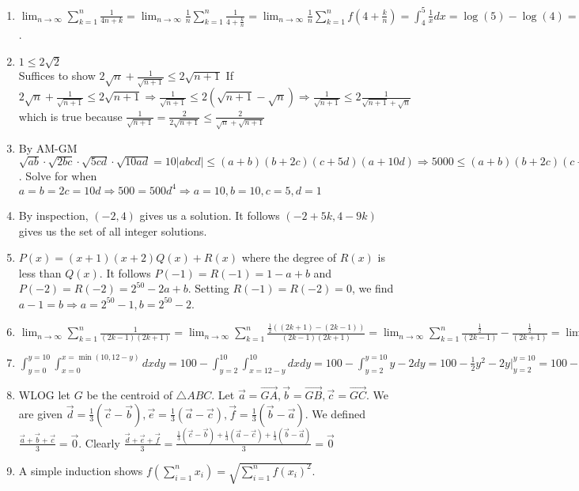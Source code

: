 \documentclass[10pt]{article}
\begin{document}
\begin{enumerate}[label= (Q-\arabic*)]
    \item $\lim_{n\rightarrow\infty}\sum_{k=1}^{n}\frac{1}{4n+k}=\lim_{n\rightarrow\infty}\frac{1}{n}\sum_{k=1}^{n}\frac{1}{4+\frac{k}{n}}=\lim_{n\rightarrow\infty}\frac{1}{n}\sum_{k=1}^{n}f(4+\frac{k}{n})=\int_4^5\frac{1}{x}dx=\log(5)-\log(4)=\log(\frac{5}{4})$.
    \item $1\le 2\sqrt{2}$\\
    Suffices to show $2\sqrt{n}+\frac{1}{\sqrt{n+1}}\le 2\sqrt{n+1}$
    If $2\sqrt{n}+\frac{1}{\sqrt{n+1}}\le 2\sqrt{n+1}\Rightarrow \frac{1}{\sqrt{n+1}}\le 2(\sqrt{n+1}-\sqrt{n})\Rightarrow\frac{1}{\sqrt{n+1}}\le 2\frac{1}{\sqrt{n+1}+\sqrt{n}}$ which is true because $\frac{1}{\sqrt{n+1}}=\frac{2}{2\sqrt{n+1}}\le\frac{2}{\sqrt{n}+\sqrt{n+1}}$
    \item By AM-GM $\sqrt{ab}\cdot\sqrt{2bc}\cdot\sqrt{5cd}\cdot\sqrt{10ad}=10|abcd|\le (a+b)(b+2c)(c+5d)(a+10d)\Rightarrow 5000\le (a+b)(b+2c)(c+5d)(a+10d)$. Solve for when $a=b=2c=10d\Rightarrow 500=500d^4\Rightarrow a=10,b=10,c=5,d=1$ 
    \item By inspection, $(-2,4)$ gives us a solution. It follows $(-2+5k,4-9k)$ gives us the set of all integer solutions.
    \item $P(x)=(x+1)(x+2)Q(x)+R(x)$ where the degree of $R(x)$ is less than $Q(x)$. It follows $P(-1)=R(-1)=1-a+b$ and $P(-2)=R(-2)=2^{50}-2a+b$. Setting $R(-1)=R(-2)=0$, we find $a-1=b\Rightarrow a=2^{50}-1,b=2^{50}-2$.
    \item $\lim_{n\rightarrow\infty} \sum_{k=1}^{n}\frac{1}{(2k-1)(2k+1)}=\lim_{n\rightarrow\infty}\sum_{k=1}^{n}\frac{\frac{1}{2}((2k+1)-(2k-1))}{(2k-1)(2k+1)}=\lim_{n\rightarrow\infty}\sum_{k=1}^{n}\frac{\frac{1}{2}}{(2k-1)}-\frac{\frac{1}{2}}{(2k+1)}=\lim_{n\rightarrow\infty}\frac{1}{2}\frac{1}{1}-\frac{1}{2}\frac{1}{2n+1}=\frac{1}{2}$
    \item $\int_{y=0}^{y=10}\int_{x=0}^{x=\min(10,12-y)}dxdy=100-\int_{y=2}^{10}\int_{x=12-y}^{10}dxdy=100-\int_{y=2}^{y=10}y-2dy=100-\frac{1}{2}y^2-2y|_{y=2}^{y=10}=100-30-2=68\Rightarrow P(x+y\le12)=\frac{17}{25}$
    \item WLOG let $G$ be the centroid of $\triangle ABC$. Let $\vec{a}=\vec{GA},\vec{b}=\vec{GB},\vec{c}=\vec{GC}$. We are given $\vec{d}=\frac{1}{3}(\vec{c}-\vec{b}),\vec{e}=\frac{1}{3}(\vec{a}-\vec{c}),\vec{f}=\frac{1}{3}(\vec{b}-\vec{a})$. We defined $\frac{\vec{a}+\vec{b}+\vec{c}}{3}=\vec{0}$. Clearly $\frac{\vec{d}+\vec{e}+\vec{f}}{3}=\frac{\frac{1}{3}(\vec{c}-\vec{b})+\frac{1}{3}(\vec{a}-\vec{c})+\frac{1}{3}(\vec{b}-\vec{a})}{3}=\vec{0}$
    \item A simple induction shows $f(\sum_{i=1}^{n}x_i)=\sqrt{\sum_{i=1}^{n}{f(x_i)}^2}$. 

\end{enumerate}
\end{document}
